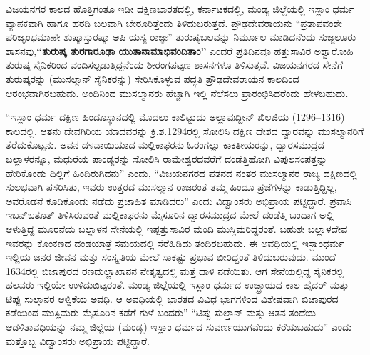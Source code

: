 ವಿಜಯನಗರ ಕಾಲದ ಹೊತ್ತಿಗಂತೂ ಇಡೀ ದಕ್ಷಿಣಭಾರತದಲ್ಲಿ, ಕರ್ನಾಟಕದಲ್ಲಿ, ಮಂಡ್ಯ ಜಿಲ್ಲೆಯಲ್ಲಿ ಇಸ್ಲಾಂ ಧರ್ಮ ವ್ಯಾಪಕವಾಗಿ ಹಾಗೂ ಹರಡಿ ಬಲವಾಗಿ ಬೇರೂರಿತ್ತೆಂದು ತಿಳಿದುಬರುತ್ತದೆ. ಪ್ರೌಢದೇವರಾಯನು “ಪ್ರತಾಪವಂಶೇ ಪರಿಜೃಂಭಮಾಣೇ ಶುಷ್ಕಾಸ್ತುರಷ್ಕಾ ಅಪಿ ಯಸ್ಯ ರಾಜ್ಞಃ” ತುರುಷ್ಕಬಲವನ್ನು ನಿರ್ಮೂಲ ಮಾಡಿದನೆಂದು ಸುಜ್ಜಲೂರು ಶಾಸನವು,\textbf{“ತುರುಷ್ಕ ತುರಗಾರೂಢಾ ಯುತಾನಾಮಾಭಿವಂದಿತಾಂ”} ಎಂದರೆ ಪ್ರತಿದಿನವೂ ಹತ್ತುಸಾವಿರ ಅಶ್ವಾರೋಹಿ ತುರುಷ್ಕ ಸೈನಿಕರಿಂದ ವಂದಿಸಲ್ಪಡುತ್ತಿದ್ದನೆಂದು ಶೀರಂಗಪಟ್ಟಣ ಶಾಸನಗಳೂ ತಿಳಿಸುತ್ತವೆ. ವಿಜಯನಗರದ ಸೇನೆಗೆ ತುರುಷ್ಕರನ್ನು (ಮುಸಲ್ಮಾನ್​ ಸೈನಿಕರನ್ನು) ಸೇರಿಸಿಕೊಳ್ಳುವ ಪದ್ಧತಿ ಪ್ರೌಢದೇವರಾಯನ ಕಾಲದಿಂದ ಆರಂಭವಾಗಿರಬಹುದು. ಅಂದಿನಿಂದ ಮುಸಲ್ಮಾನರು ಹೆಚ್ಚಾಗಿ ಇಲ್ಲಿ ನೆಲೆಸಲು ಪ್ರಾರಂಭಿಸಿದರೆಂದು ಹೇಳಬಹುದು.

“ಇಸ್ಲಾಂ ಧರ್ಮ ದಕ್ಷಿಣ ಹಿಂದೂಸ್ಥಾನದಲ್ಲಿ ಮೊದಲು ಕಾಲಿಟ್ಟುದು ಅಲ್ಲಾವುದ್ದೀನ್​ ಖಿಲಜಿಯ (1296–1316) ಕಾಲದಲ್ಲಿ. ಆತನು ದೇವಗಿರಿಯ ಯಾದವರನ್ನು ಕ್ರಿ.ಶ.1294ರಲ್ಲಿ ಸೋಲಿಸಿ ದಕ್ಷಿಣ ದೇಶದ ದ್ವಾರವನ್ನು ಮುಸಲ್ಮಾನರಿಗೆ ತೆರೆದುಕೊಟ್ಟನು. ಅವನ ದಳವಾಯಿಯಾದ ಮಲ್ಲಿಕಾಫರನು ಓರಂಗಲ್ಲು ಕಾಕತೀಯರನ್ನು, ದ್ವಾರಸಮುದ್ರದ ಬಲ್ಲಾಳರನ್ನೂ, ಮಧುರೆಯ ಪಾಂಡ್ಯರನ್ನು ಸೋಲಿಸಿ ರಾಮೇಶ್ವರದವರೆಗೆ ದಂಡೆತ್ತಿಹೋಗಿ ವಿಪುಲಸಂಪತ್ತನ್ನು ಹೇರಿಕೊಂಡು ದಿಲ್ಲಿಗೆ ಹಿಂದಿರುಗಿದನು” ಎಂದು, “ವಿಜಯನಗರದ ಪತನದ ನಂತರ ಮುಸಲ್ಮಾನರ ರಾಜ್ಯ ದಕ್ಷಿಣದಲ್ಲಿ ಸುಲಭವಾಗಿ ಪಸರಿಸಿತು, ಇವರು ಉತ್ತರದ ಮುಸಲ್ಮಾನ ರಾಜರಂತೆ ತಮ್ಮ ಹಿಂದೂ ಪ್ರಜೆಗಳನ್ನು ಕಾಡುತ್ತಿದ್ದಿಲ್ಲ, ಅವರೊಡನೆ ಕೂಡಿಕೊಂಡು ನಡೆದು ಪ್ರಜಾಹಿತ ಮಾಡಿದರು” ಎಂದು ವಿದ್ವಾಂಸರು ಅಭಿಪ್ರಾಯ ಪಟ್ಟಿದ್ದಾರೆ. ಪ್ರವಾಸಿ ಇಬನ್​ಬತೂತ್​ ತಿಳಿಸಿರುವಂತೆ ಮಲ್ಲಿಕಾಫರನು ಮೈಸೂರಿನ ದ್ವಾರಸಮುದ್ರದ ಮೇಲೆ ದಂಡೆತ್ತಿ ಬಂದಾಗ ಅಲ್ಲಿ ಆಳುತ್ತಿದ್ದ ಮೂರನೆಯ ಬಲ್ಲಾಳನ ಸೇನೆಯಲ್ಲಿ ಇಪ್ಪತ್ತುಸಾವಿರ ಮಂದಿ ಮುಸ್ಲಿಮರಿದ್ದರಂತೆ. ಬಹುಶಃ ಬಲ್ಲಾಳದೇವ ಇವರನ್ನು ಕೊಂಕಣದ ದಂಡಯಾತ್ರೆ ಸಮಯದಲ್ಲಿ ಸೆರೆಹಿಡಿದು ತಂದಿರಬಹುದು. ಈ ಅವಧಿಯಲ್ಲಿ ಇಸ್ಲಾಂಧರ್ಮ ಇಲ್ಲಿಯ ಜನರ ಜೀವನ ಮತ್ತು ಸಂಸ್ಕೃತಿಯ ಮೇಲೆ ಸಾಕಷ್ಟು ಪ್ರಭಾವ ಬೀರಿದ್ದಂತೆ ತಿಳಿದುಬರುವುದು. ಮುಂದೆ 1634ರಲ್ಲಿ ಬಿಜಾಪುರದ ರಣದುಲ್ಲಾಖಾನನ ನೇತೃತ್ವದಲ್ಲಿ ಮತ್ತೆ ದಾಳಿ ನಡೆಯಿತು. ಆಗ ಸೇನೆಯಲ್ಲಿದ್ದ ಸೈನಿಕರಲ್ಲಿ ಹಲವರು ಇಲ್ಲಿಯೇ ಉಳಿದುಬಿಟ್ಟರಂತೆ. ಮಂಡ್ಯ ಜಿಲ್ಲೆಯಲ್ಲಿ ಇಸ್ಲಾಂ ಧರ್ಮದ ಉಚ್ಛ್ರಾಯದ ಕಾಲ ಹೈದರ್​ ಮತ್ತು ಟಿಪ್ಪು ಸುಲ್ತಾನರ ಆಳ್ವಿಕೆಯ ಅವಧಿ. ಆ ಅವಧಿಯಲ್ಲಿ ಭಾರತದ ವಿವಿಧ ಭಾಗಗಳಿಂದ ವಿಶೇಷವಾಗಿ ಬಿಜಾಪುರದ ಕಡೆಯಿಂದ ಮುಸ್ಲಿಮರು ಮೈಸೂರಿನ ಕಡೆಗೆ ಗುಳೆ ಬಂದರು” “ಟಿಪ್ಪು ಸುಲ್ತಾನ್​ ಮತ್ತು ಆತನ ತಂದೆಯ ಆಡಳಿತಾವಧಿಯನ್ನು ನಮ್ಮ ಜಿಲ್ಲೆಯ (ಮಂಡ್ಯ) ಇಸ್ಲಾಂ ಧರ್ಮದ ಸುವರ್ಣಯುಗವೆಂದು ಕರೆಯಬಹುದು” ಎಂದು ಮತ್ತೊಬ್ಬ ವಿದ್ವಾಂಸರು ಅಭಿಪ್ರಾಯ ಪಟ್ಟಿದ್ದಾರೆ.

